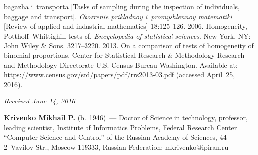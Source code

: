 \begin{multicols}{2}
{{\begin{thebibliography}{99}
bagazha i~transporta [Tasks of sampling during the inspection of individuals, 
baggage and transport]. \textit{Obozrenie prikladnoy i~promyshlennoy matematiki} 
[Review of applied and industrial mathematics] 18:125--126.
 2006. Homogeneity, Potthoff--Whittighill tests of. 
\textit{Encyclopedia of statistical sciences}. New York, NY: John Wiley \& Sons. 
3217--3220.
 2013. On a comparison of tests of homogeneity of 
binomial proportions. Center for Statistical Research \& Methodology Research and 
Methodology Directorate U.S. Census Bureau Washington. Available at: {\sf 
https://www.census.gov/srd/papers/pdf/rrs2013-03.pdf} (accessed April~25, 2016).
   \end{thebibliography}

 }
 }

\end{multicols}

\vspace*{-9pt}

\hfill{\small\textit{Received June 14, 2016}}

\vspace*{-3pt}

\Contr

\noindent
\textbf{Krivenko Mikhail P.} (b.\ 1946)~--- 
Doctor of Science in technology, professor, leading scientist, 
Institute of Informatics Problems, Federal Research Center ``Computer 
Science and Control'' of the Russian Academy of Sciences, 44-2~Vavilov Str., 
Moscow 119333, Russian Federation; \mbox{mkrivenko@ipiran.ru}




  \label{end\stat}
  
  
  \renewcommand{\bibname}{\protect\rm Литература}